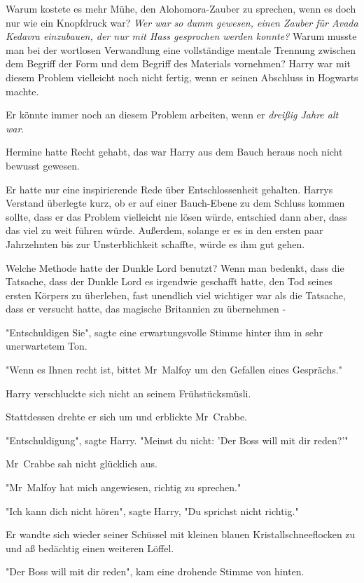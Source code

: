 {Warum kostete es mehr Mühe, den Alohomora-Zauber zu sprechen, wenn es doch nur wie ein Knopfdruck war? \emph{Wer war so dumm gewesen, einen Zauber für Avada Kedavra einzubauen, der nur mit Hass gesprochen werden konnte?} Warum musste man bei der wortlosen Verwandlung eine vollständige mentale Trennung zwischen dem Begriff der Form und dem Begriff des Materials vornehmen? Harry war mit diesem Problem vielleicht noch nicht fertig, wenn er seinen Abschluss in Hogwarts machte.

Er könnte immer noch an diesem Problem arbeiten, wenn er \emph{dreißig Jahre alt war}.

Hermine hatte Recht gehabt, das war Harry aus dem Bauch heraus noch nicht bewusst gewesen.

Er hatte nur eine inspirierende Rede über Entschlossenheit gehalten. Harrys Verstand überlegte kurz, ob er auf einer Bauch-Ebene zu dem Schluss kommen sollte, dass er das Problem vielleicht nie lösen würde, entschied dann aber, dass das viel zu weit führen würde. Außerdem, solange er es in den ersten paar Jahrzehnten bis zur Unsterblichkeit schaffte, würde es ihm gut gehen.

Welche Methode hatte der Dunkle Lord benutzt? Wenn man bedenkt, dass die Tatsache, dass der Dunkle Lord es irgendwie geschafft hatte, den Tod seines ersten Körpers zu überleben, fast unendlich viel wichtiger war als die Tatsache, dass er versucht hatte, das magische Britannien zu übernehmen -

"Entschuldigen Sie", sagte eine erwartungsvolle Stimme hinter ihm in sehr unerwartetem Ton.

"Wenn es Ihnen recht ist, bittet Mr~Malfoy um den Gefallen eines Gesprächs."

Harry verschluckte sich nicht an seinem Frühstücksmüsli.

Stattdessen drehte er sich um und erblickte Mr~Crabbe.

"Entschuldigung", sagte Harry. "Meinst du nicht: 'Der Boss will mit dir reden?'"

Mr~Crabbe sah nicht glücklich aus.

"Mr~Malfoy hat mich angewiesen, richtig zu sprechen."

"Ich kann dich nicht hören", sagte Harry, "Du sprichst nicht richtig."

Er wandte sich wieder seiner Schüssel mit kleinen blauen Kristallschneeflocken zu und aß bedächtig einen weiteren Löffel.

"Der Boss will mit dir reden", kam eine drohende Stimme von hinten.

}
